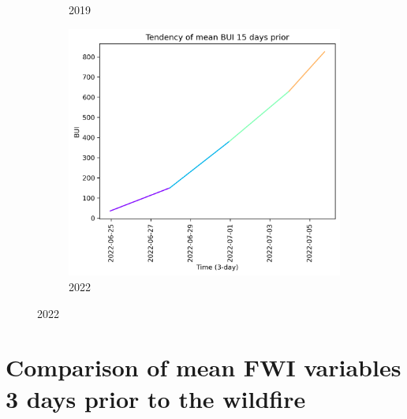 \begin{figure}[h]
\begin{subfigure}{0.3\textwidth}
        \caption{2019}
        \label{fig:bui_prior_15_days_2019}
    \end{subfigure}
    \hfill
    \begin{subfigure}{0.3\textwidth}
        \centering
        \includegraphics[width=\textwidth]{graphs/15days/2022_15daysprior_tendency_graph_BUI.png}
        \caption{2022}
        \label{fig:bui_prior_15_days_2022}
    \end{subfigure}
    
    \label{fig:bui_values_15days_prior}
\end{figure}

\FloatBarrier

\section{Comparison of mean FWI variables 3 days prior to the wildfire}

